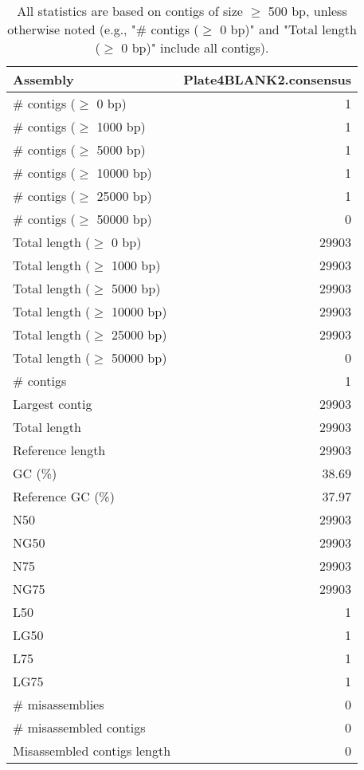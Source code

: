 \documentclass[12pt,a4paper]{article}
\begin{document}
\begin{table}[ht]
\begin{center}
\caption{All statistics are based on contigs of size $\geq$ 500 bp, unless otherwise noted (e.g., "\# contigs ($\geq$ 0 bp)" and "Total length ($\geq$ 0 bp)" include all contigs).}
\begin{tabular}{|l*{1}{|r}|}
\hline
Assembly & Plate4BLANK2.consensus \\ \hline
\# contigs ($\geq$ 0 bp) & 1 \\ \hline
\# contigs ($\geq$ 1000 bp) & 1 \\ \hline
\# contigs ($\geq$ 5000 bp) & 1 \\ \hline
\# contigs ($\geq$ 10000 bp) & 1 \\ \hline
\# contigs ($\geq$ 25000 bp) & 1 \\ \hline
\# contigs ($\geq$ 50000 bp) & 0 \\ \hline
Total length ($\geq$ 0 bp) & 29903 \\ \hline
Total length ($\geq$ 1000 bp) & 29903 \\ \hline
Total length ($\geq$ 5000 bp) & 29903 \\ \hline
Total length ($\geq$ 10000 bp) & 29903 \\ \hline
Total length ($\geq$ 25000 bp) & 29903 \\ \hline
Total length ($\geq$ 50000 bp) & 0 \\ \hline
\# contigs & 1 \\ \hline
Largest contig & 29903 \\ \hline
Total length & 29903 \\ \hline
Reference length & 29903 \\ \hline
GC (\%) & 38.69 \\ \hline
Reference GC (\%) & 37.97 \\ \hline
N50 & 29903 \\ \hline
NG50 & 29903 \\ \hline
N75 & 29903 \\ \hline
NG75 & 29903 \\ \hline
L50 & 1 \\ \hline
LG50 & 1 \\ \hline
L75 & 1 \\ \hline
LG75 & 1 \\ \hline
\# misassemblies & 0 \\ \hline
\# misassembled contigs & 0 \\ \hline
Misassembled contigs length & 0 \\ \hline

\end{tabular}
\end{center}
\end{table}
\end{document}
